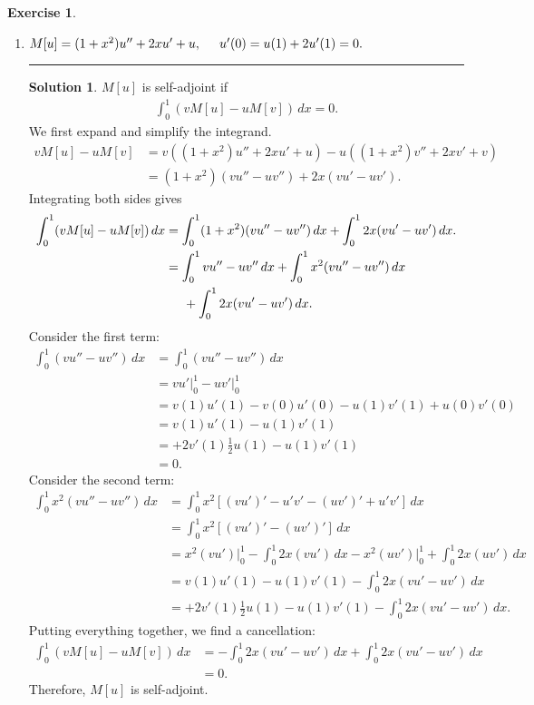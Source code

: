 \documentclass{article}
\theoremstyle{definition}
\newtheorem*{exer*}{Exercise}
\newtheorem*{sln*}{Solution}
\begin{document}
\begin{exer*}
\begin{enumerate}
		
		\item $M[u] = (1+x^2)u'' + 2xu' + u,\hspace{0.5cm} u'(0) = u(1) + 2u'(1) = 0.$\\
		\noindent\rule{\textwidth}{0.5pt}
		\begin{sln*}
			$M[u]$ is self-adjoint if
			\begin{align*}
			\int^1_0 (vM[u] - uM[v])\,dx = 0.
			\end{align*}
			We first expand and simplify the integrand.
			\begin{align*}
			vM[u] - uM[v] &= v((1+x^2)u'' + 2xu' + u) - u((1+x^2)v'' + 2xv' + v)\\
			&= (1+x^2)(vu'' - uv'') + 2x(vu' - uv').
			\end{align*} 
			Integrating both sides gives
			\begin{align*}
			\int^1_0 (vM[u] - uM[v])\,dx &= \int^1_0 (1+x^2)(vu'' - uv'')\,dx + \int^1_0 2x(vu' - uv')\,dx.\\
			&=\int^1_0 vu'' - uv''\,dx + \int^1_0 x^2(vu'' - uv'')\,dx\\
			&\hspace{0.5cm} + \int^1_0 2x(vu' - uv')\,dx.
			\end{align*}
			Consider the first term:
			\begin{align*}
			\int^1_0 (vu'' - uv'')\,dx &= \int^1_0 (vu'' - uv'')\,dx\\
			&= vu'\bigg\vert^1_0 - uv'\bigg\vert^1_0\\
			&= v(1)u'(1) - v(0)u'(0) - u(1)v'(1) + u(0)v'(0)\\
			&= v(1)u'(1) - u(1)v'(1)\\
			&= +2v'(1)\frac{1}{2}u(1) - u(1)v'(1)\\
			&= 0.
			\end{align*}
			Consider the second term:
			\begin{align*}
			\int^1_0 x^2(vu'' - uv'')\,dx &= \int^1_0 x^2 \left[ (vu')' - u'v' - (uv')' + u'v'  \right]\,dx\\
			&= \int^1_0 x^2\left[ (vu')' - (uv')' \right]\,dx\\
			&= x^2(vu')\bigg\vert^1_0 - \int^1_0 2x(vu')\,dx - x^2(uv')\bigg\vert^1_0 + \int^1_0 2x(uv')\,dx\\
			&= v(1)u'(1) - u(1)v'(1) - \int^1_0 2x(vu' - uv')\,dx\\
			&= +2v'(1)\frac{1}{2}u(1) - u(1)v'(1) - \int^1_0 2x(vu' - uv')\,dx.
			\end{align*} 
			Putting everything together, we find a cancellation:
			\begin{align*}
			\int^1_0 (vM[u] - uM[v])\,dx &= - \int^1_0 2x(vu' - uv')\,dx + \int^1_0 2x(vu' - uv')\,dx\\
			&= 0.
			\end{align*} 
			Therefore, $M[u]$ is self-adjoint. 
			

\end{sln*}
\end{enumerate}
\end{exer*}
\end{document}
